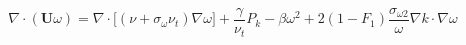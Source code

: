 \documentclass[11pt]{article}
\begin{document}
\begin{equation*}
\nabla \cdot (\mathbf{U} \omega) = \nabla \cdot \bigl[(\nu + \sigma_\omega \nu_t) \nabla \omega\bigr] + \frac{\gamma}{\nu_t} P_k - \beta \omega^2 + 2(1 - F_1) \frac{\sigma_{\omega 2}}{\omega} \nabla k \cdot \nabla \omega\tag{5}
\end{equation*}
\end{document}
